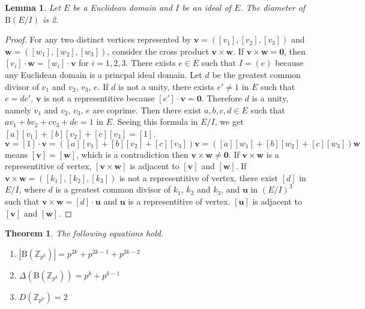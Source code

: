 \documentclass{article}
\newtheorem{Lem}{Lemma}
\newtheorem*{Th}{Theorem}
\newcommand{\Z}{\mathbb Z}
\newcommand{\B}{\mathrm{B}}
\begin{document}
\begin{Lem}\label{Lem:diameter}
Let $E$ be a Euclidean domain and $I$ be an ideal of $E$. The diameter of $\B(E/I)$ is 2.
\end{Lem}

\begin{proof}
For any two distinct vertices represented by $\bm v = ([v_1],[v_2],[v_3])$ and $\bm w=([w_1],[w_2],[w_3])$, consider the cross product $\bm v \times \bm w$. 
If $\bm v \times \bm w = \bm 0$, then $[v_i] \cdot \bm w = [w_i] \cdot \bm v$ for $i=1,2,3$. 
There exists $e \in E$ such that $I = (e)$ because any Euclidean domain is a princpal ideal domain.
Let $d$ be the greatest common divisor of $v_1$ and $v_2$, $v_3$, $e$. If $d$ is not a unity, there exists $e' \neq 1$ in $E$ such that $e=de'$. $\bm v$ is not a representitive because $[e'] \cdot \bm v = \bm 0$. Therefore $d$ is a unity, namely $v_1$ and $v_2$, $v_3$, $e$ are coprime.
Then there exist $a, b, c, d \in E$ such that $ a v_1 + b v_2 + c v_3 + d e = 1$ in $E$.
Seeing this formula in $E/I$, we get $[a] [v_1] + [b] [v_2] + [c] [v_3] = [1]$.
\[ \bm v = [1] \cdot \bm v = ( [a] [v_1] + [b] [v_2] + [c] [v_3] ) \bm v = ( [a] [w_1] + [b] [w_2] + [c] [w_3] ) \bm w\]
means $[\bm v] = [\bm w]$, which is a contradiction then $\bm v \times \bm w \neq \bm 0$. 
If $\bm v \times \bm w$ is a representitive of vertex, $[\bm v \times \bm w]$ is adjacent to $[\bm v]$ and $[\bm w]$.
If $\bm v \times \bm w = ([k_1],[k_2],[k_3])$ is not a representitive of vertex, there exist $[d]$ in $E/I$, where $d$ is a greatest common divisor of $k_1$, $k_2$ and $k_3$, and $\bm u$ in $(E/I)^3$ such that $\bm v \times \bm w = [d] \cdot \bm u$ and $\bm u$ is a representitive of vertex. $[\bm u]$ is adjacent to $[\bm v]$ and $[\bm w]$.
\end{proof}

\begin{Th}
The following equations hold.
\begin{enumerate}
\item $ |\B(\Z_{p^k})| = p^{2k}+p^{2k-1}+p^{2k-2} $
\item $ \Delta(\B(\Z_{p^k})) = p^k + p^{k-1} $
\item $ D(\Z_{p^k}) = 2$
\end{enumerate}
\end{Th}
\end{document}
